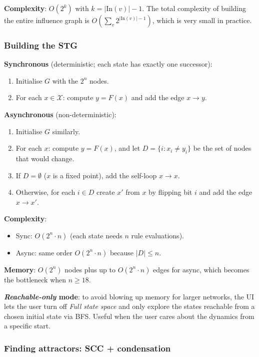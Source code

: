 \documentclass[oneside,final]{hcmut-report}
\begin{document}
\textbf{Complexity}: $O(2^{k})$ with $k = |\mathrm{In}(v)| - 1$. The total complexity of building the entire influence graph is $O(\sum_v 2^{|\mathrm{In}(v)|-1})$, which is very small in practice.

\subsubsection{Building the STG}

\textbf{Synchronous} (deterministic; each state has exactly one successor):
\begin{enumerate}[leftmargin=*]
    \item Initialise $G$ with the $2^n$ nodes.
    \item For each $x \in \mathcal{X}$: compute $y = F(x)$ and add the edge $x \to y$.
\end{enumerate}

\textbf{Asynchronous} (non-deterministic):
\begin{enumerate}[leftmargin=*]
    \item Initialise $G$ similarly.
    \item For each $x$: compute $y = F(x)$, and let $D = \{i : x_i \neq y_i\}$ be the set of nodes that would change.
    \item If $D = \emptyset$ ($x$ is a fixed point), add the self-loop $x \to x$.
    \item Otherwise, for each $i \in D$ create $x'$ from $x$ by flipping bit $i$ and add the edge $x \to x'$.
\end{enumerate}

\textbf{Complexity}:
\begin{itemize}[leftmargin=*]
    \item Sync: $O(2^n \cdot n)$ (each state needs $n$ rule evaluations).
    \item Async: same order $O(2^n \cdot n)$ because $|D| \leq n$.
\end{itemize}

\textbf{Memory}: $O(2^n)$ nodes plus up to $O(2^n \cdot n)$ edges for async, which becomes the bottleneck when $n \geq 18$.

\textbf{\textit{Reachable-only} mode}: to avoid blowing up memory for larger networks, the UI lets the user turn off \textit{Full state space} and only explore the states reachable from a chosen initial state via BFS. Useful when the user cares about the dynamics from a specific start.

\subsubsection{Finding attractors: SCC + condensation}
\end{document}

